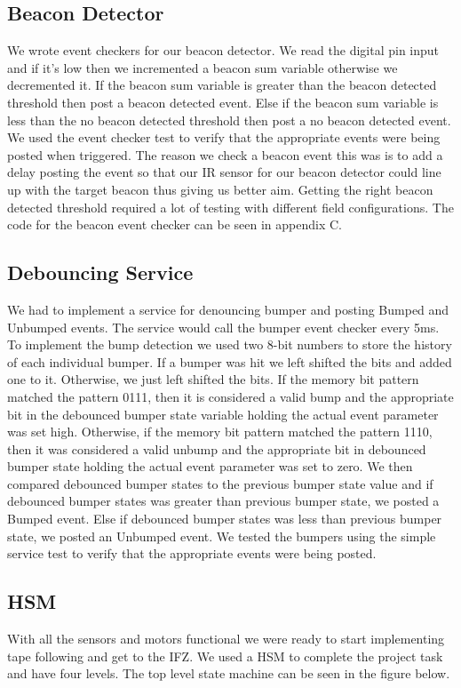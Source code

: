 \documentclass{article}
\begin{document}
\subsection{Beacon Detector}
We wrote event checkers for our beacon detector.  We read the digital pin input and if it's low then we incremented a beacon sum variable otherwise we decremented it.  If the beacon sum variable is greater than the beacon detected threshold then post a beacon detected event.  Else if the beacon sum variable is less than the no beacon detected threshold then post a no beacon detected event.  We used the event checker test to verify that the appropriate events were being posted when triggered.  The reason we check a beacon event this was is to add a delay posting the event so that our IR sensor for our beacon detector could line up with the target beacon thus giving us better aim.  Getting the right beacon detected threshold required a lot of testing with different field configurations.  The code for the beacon event checker can be seen in appendix C.

\subsection{Debouncing Service}
We had to implement a service for denouncing bumper and posting Bumped and Unbumped events.  The service would call the bumper event checker every 5ms.  To implement the bump detection we used two 8-bit numbers to store the history of each individual bumper.  If a bumper was hit we left shifted the bits and added one to it.  Otherwise, we just left shifted the bits.  If the memory bit pattern matched the pattern 0111, then it is considered a valid bump and the appropriate bit in the debounced bumper state variable holding the actual event parameter was set high.  Otherwise, if the memory bit pattern matched the pattern 1110, then it was considered a valid unbump and the appropriate bit in debounced bumper state holding the actual event parameter was set to zero.  We then compared debounced bumper states to the previous bumper state value and if debounced bumper states was greater than previous bumper state, we posted a Bumped event.  Else if debounced bumper states was less than previous bumper state, we posted an Unbumped event.  We tested the bumpers using the simple service test to verify that the appropriate events were being posted.    

\subsection{HSM}
With all the sensors and motors functional we were ready to start implementing tape following and get to the IFZ.  We used a HSM to complete the project task and have four levels.  The top level state machine can be seen in the figure below.  
\end{document}
